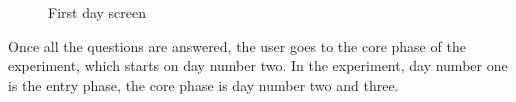 \begin{figure}[htp]
  \hspace{3em}
  \caption{First day screen}
  \label{fig:first}
\end{figure}

Once all the questions are answered, the user goes to the core phase of the experiment, which starts on day number two. In the experiment, day number one is the entry phase, the core phase is day number two and three.

